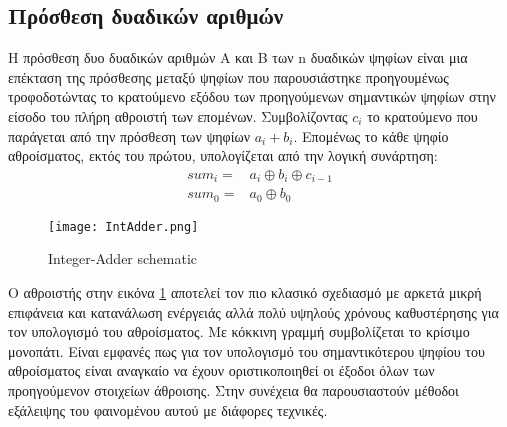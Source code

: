 % 
\subsection{Πρόσθεση δυαδικών αριθμών}

Η πρόσθεση δυο δυαδικών αριθμών A και Β των n δυαδικών ψηφίων είναι 
μια επέκταση της πρόσθεσης μεταξύ ψηφίων που παρουσιάστηκε προηγουμένως τροφοδοτώντας 
το κρατούμενο εξόδου των προηγούμενων σημαντικών ψηφίων στην είσοδο του πλήρη αθροιστή 
των επομένων. Συμβολίζοντας $c_{i}$ το κρατούμενο που παράγεται από την πρόσθεση των ψηφίων 
$a_i+b_i$. Επομένως το κάθε ψηφίο αθροίσματος, εκτός του πρώτου, υπολογίζεται από την 
λογική συνάρτηση:
\begin{equation}
\begin{split}
    sum_i =& a_i \oplus b_i \oplus c_{i-1}\\
    sum_0 =& a_0 \oplus b_0    
\end{split}
\end{equation}

\begin{figure}[H]
\centering
\texttt{[image: IntAdder.png]}
\caption{Integer-Adder schematic}
\label{IntegerAdderSchematic}
\end{figure}
Ο αθροιστής στην εικόνα \ref{IntegerAdderSchematic} αποτελεί τον πιο κλασικό σχεδιασμό 
με αρκετά μικρή επιφάνεια και κατανάλωση ενέργειάς αλλά πολύ υψηλούς χρόνους καθυστέρησης 
για τον υπολογισμό του αθροίσματος. Με κόκκινη γραμμή συμβολίζεται το κρίσιμο μονοπάτι. Είναι εμφανές πως για τον υπολογισμό του σημαντικότερου ψηφίου του αθροίσματος είναι αναγκαίο να έχουν οριστικοποιηθεί οι έξοδοι όλων των προηγούμενον στοιχείων άθροισης. Στην συνέχεια θα παρουσιαστούν μέθοδοι εξάλειψης του φαινομένου αυτού με διάφορες τεχνικές.



